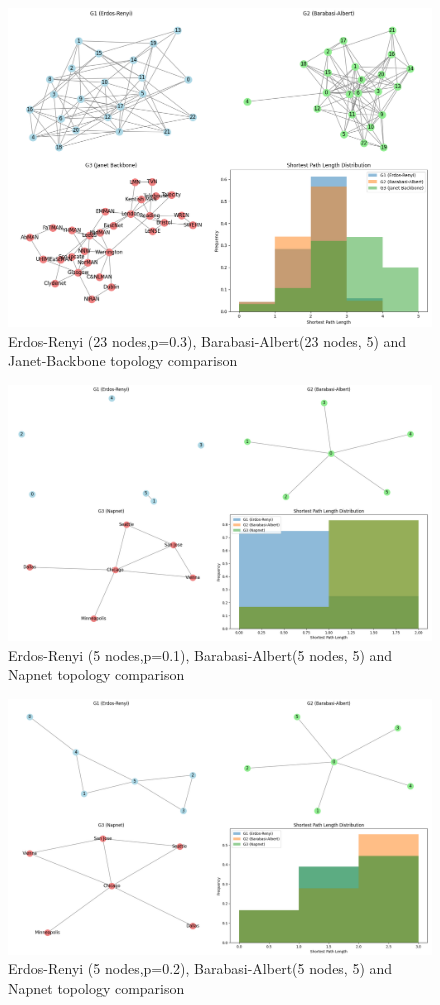 \begin{figure}
    \centering
    \includegraphics[width=0.7\linewidth]{images/final-topo-comparison/3_1.png}
    \caption{Erdos-Renyi (23 nodes,p=0.3), Barabasi-Albert(23 nodes, 5) and Janet-Backbone topology comparison}
    \label{fig:3_1_comparison}
\end{figure}

\newpage

\begin{figure}
    \centering
    \includegraphics[width=0.7\linewidth]{images/final-topo-comparison/napnet/1_1.png}
    \caption{Erdos-Renyi (5 nodes,p=0.1), Barabasi-Albert(5 nodes, 5) and Napnet topology comparison}
    \label{fig:napnet_1}
\end{figure}

\begin{figure}
    \centering
    \includegraphics[width=0.7\linewidth]{images/final-topo-comparison/napnet/2_1.png}
    \caption{Erdos-Renyi (5 nodes,p=0.2), Barabasi-Albert(5 nodes, 5) and Napnet topology comparison}
    \label{fig:napnet_2}
\end{figure}


